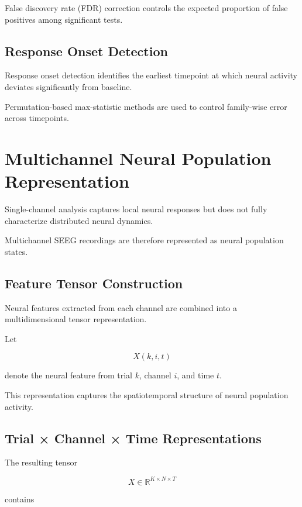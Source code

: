 \documentclass[11pt]{report}
\begin{document}
False discovery rate (FDR) correction controls the expected
proportion of false positives among significant tests.

\section{Response Onset Detection}

Response onset detection identifies the earliest timepoint at which
neural activity deviates significantly from baseline.

Permutation-based max-statistic methods are used to control
family-wise error across timepoints.

\chapter{Multichannel Neural Population Representation}

Single-channel analysis captures local neural responses but does not
fully characterize distributed neural dynamics.

Multichannel SEEG recordings are therefore represented as neural
population states.

\section{Feature Tensor Construction}

Neural features extracted from each channel are combined into a
multidimensional tensor representation.

Let

\begin{equation}
X(k,i,t)
\end{equation}

denote the neural feature from trial $k$, channel $i$, and time $t$.

This representation captures the spatiotemporal structure of neural
population activity.

\section{Trial × Channel × Time Representations}

The resulting tensor

\begin{equation}
X \in \mathbb{R}^{K \times N \times T}
\end{equation}

contains
\end{document}
